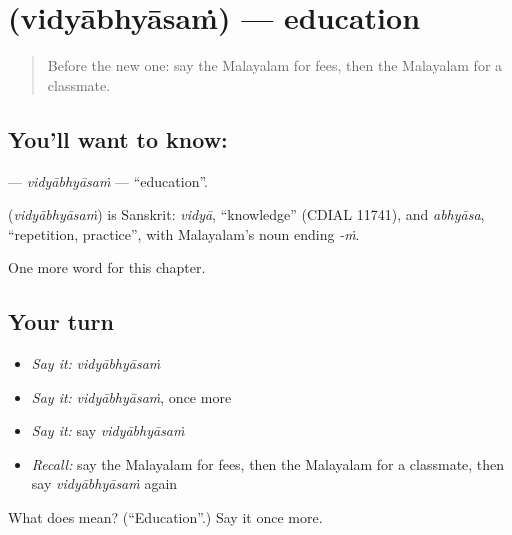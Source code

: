 \section[\texorpdfstring{\ml{വിദ്യാഭ്യാസം} (vidyābhyāsaṁ)}{വിദ്യാഭ്യാസം (vidyābhyāsaṁ)}]{ (vidyābhyāsaṁ) — education}

\label{lesson:ML-C221-vidyabhyasam}



\begin{quote}
Before the new one: say the Malayalam for fees, then the Malayalam for a classmate.
\end{quote}

\subsection*{You'll want to know: }
\textbf{} — \emph{vidyābhyāsaṁ} — \textquotedblleft{}education\textquotedblright{}.

\begin{cousinweb}
\textbf{} (\emph{vidyābhyāsaṁ}) is Sanskrit: \emph{vidyā}, \textquotedblleft{}knowledge\textquotedblright{} (CDIAL 11741), and \emph{abhyāsa}, \textquotedblleft{}repetition, practice\textquotedblright{}, with Malayalam's noun ending \emph{-ṁ}.
\end{cousinweb}

\begin{grammarlens}[title={What you've built}]
One more word for this chapter.
\end{grammarlens}

\subsection*{Your turn}
\begin{itemize}
\raggedright
  \item \emph{Say it:} \emph{vidyābhyāsaṁ}
  \item \emph{Say it:} \emph{vidyābhyāsaṁ}, once more
  \item \emph{Say it:} say \emph{vidyābhyāsaṁ}
  \item \emph{Recall:} say the Malayalam for fees, then the Malayalam for a classmate, then say \emph{vidyābhyāsaṁ} again
\end{itemize}

\begin{tcolorbox}[breakable,colback=teal!4,colframe=teal!35!black,title={Before you move on}]
What does  mean? (\textquotedblleft{}Education\textquotedblright{}.) Say it once more.
\end{tcolorbox}
